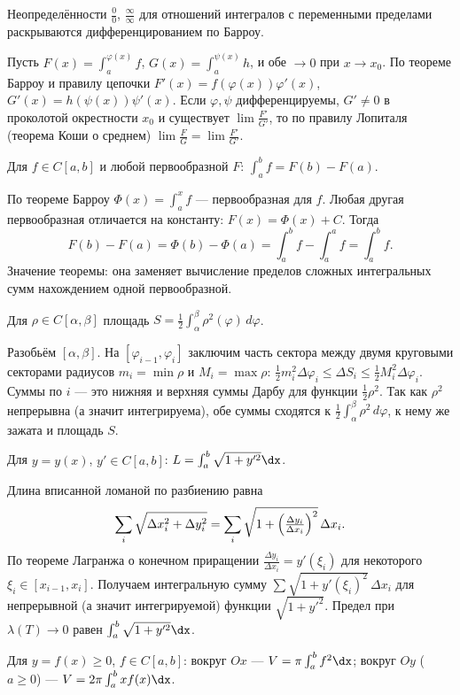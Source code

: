 \stmt Неопределённости $\tfrac00$, $\tfrac\infty\infty$ для отношений интегралов с переменными
пределами раскрываются дифференцированием по Барроу.

\dok Пусть $F(x)=\int_{a}^{\varphi(x)}f$, $G(x)=\int_{a}^{\psi(x)}h$, и обе $\to0$ при $x\to x_0$.
По теореме Барроу и правилу цепочки $F'(x)=f(\varphi(x))\varphi'(x)$,
$G'(x)=h(\psi(x))\psi'(x)$. Если $\varphi,\psi$ дифференцируемы, $G'\ne0$ в проколотой окрестности
$x_0$ и существует $\lim\tfrac{F'}{G'}$, то по правилу Лопиталя (теорема Коши о среднем)
$\lim\tfrac FG=\lim\tfrac{F'}{G'}$.

\stmt Для $f\in C[a,b]$ и любой первообразной $F$: $\int_a^b f=F(b)-F(a)$.

\dok По теореме Барроу $\Phi(x)=\int_a^x f$ — первообразная для $f$. Любая другая первообразная
отличается на константу: $F(x)=\Phi(x)+C$. Тогда
\[
  F(b)-F(a)=\Phi(b)-\Phi(a)=\int_a^b f-\int_a^a f=\int_a^b f .
\]
Значение теоремы: она заменяет вычисление пределов сложных интегральных сумм нахождением одной
первообразной.

\stmt Для $\rho\in C[\alpha,\beta]$ площадь $S=\tfrac12\int_\alpha^\beta\rho^2(\varphi)\,d\varphi$.

\dok Разобьём $[\alpha,\beta]$. На $[\varphi_{i-1},\varphi_i]$ заключим часть сектора между двумя
круговыми секторами радиусов $m_i=\min\rho$ и $M_i=\max\rho$:
$\tfrac12 m_i^2\Delta\varphi_i\le\Delta S_i\le\tfrac12 M_i^2\Delta\varphi_i$. Суммы по $i$ —
это нижняя и верхняя суммы Дарбу для функции $\tfrac12\rho^2$. Так как $\rho^2$ непрерывна (а значит
интегрируема), обе суммы сходятся к $\tfrac12\int_\alpha^\beta\rho^2\,d\varphi$, к нему же зажата и
площадь $S$.

\stmt Для $y=y(x)$, $y'\in C[a,b]$: $L=\int_a^b\sqrt{1+y'^2}\dx$.

\dok Длина вписанной ломаной по разбиению равна
\[
  \sum_i\sqrt{\Delta x_i^2+\Delta y_i^2}=\sum_i\sqrt{1+\Bigl(\tfrac{\Delta y_i}{\Delta x_i}\Bigr)^2}\,
  \Delta x_i .
\]
По теореме Лагранжа о конечном приращении $\tfrac{\Delta y_i}{\Delta x_i}=y'(\xi_i)$ для некоторого
$\xi_i\in[x_{i-1},x_i]$. Получаем интегральную сумму
$\sum\sqrt{1+y'(\xi_i)^2}\,\Delta x_i$ для непрерывной (а значит интегрируемой) функции
$\sqrt{1+y'^2}$. Предел при $\lambda(T)\to0$ равен $\int_a^b\sqrt{1+y'^2}\dx$.

\stmt Для $y=f(x)\ge0$, $f\in C[a,b]$: вокруг $Ox$ — $V=\pi\int_a^b f^2\dx$; вокруг $Oy$ ($a\ge0$) —
$V=2\pi\int_a^b x f(x)\dx$.

